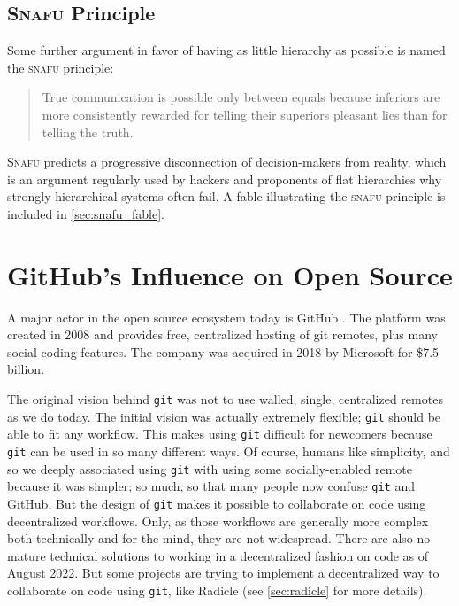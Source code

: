 \subsection{\textsc{Snafu} Principle}

Some further argument in favor of having as little hierarchy as possible is named the \textsc{snafu} principle:
\blockcquote{noauthor_snafu_nodate}{True communication is possible only between equals because inferiors are more consistently rewarded for telling their superiors pleasant lies than for telling the truth.}

\textsc{Snafu} predicts a progressive disconnection of decision-makers from reality, which is an argument regularly used by hackers and proponents of flat hierarchies why strongly hierarchical systems often fail.
A fable illustrating the \textsc{snafu} principle is included in \cref{sec:snafu_fable}.

\section{GitHub's Influence on Open Source}

A major actor in the open source ecosystem today is GitHub \cite{noauthor_github_2022}.
The platform was created in 2008 and provides free, centralized hosting of git remotes, plus many social coding features.
The company was acquired in 2018 by Microsoft for \$7.5 billion.

The original vision behind \texttt{git} was not to use walled, single, centralized remotes as we do today.
The initial vision was actually extremely flexible; \texttt{git} should be able to fit any workflow.
This makes using \texttt{git} difficult for newcomers because \texttt{git} can be used in so many different ways.
Of course, humans like simplicity, and so we deeply associated using \texttt{git} with using some socially-enabled remote because it was simpler; so much, so that many people now confuse \texttt{git} and GitHub.
But the design of \texttt{git} makes it possible to collaborate on code using decentralized workflows.
Only, as those workflows are generally more complex both technically and for the mind, they are not widespread.
There are also no mature technical solutions to working in a decentralized fashion on code as of August 2022.
But some projects are trying to implement a decentralized way to collaborate on code using \texttt{git}, like Radicle (see \cref{sec:radicle} for more details).

